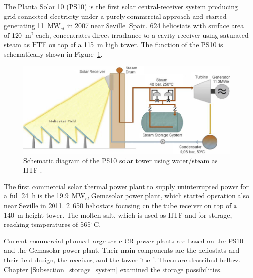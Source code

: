 The Planta Solar 10 (PS10) is the first solar central-receiver system producing grid-connected electricity under a purely commercial approach and started generating 11~MW$_{el}$ in 2007 near Seville, Spain. 624 heliostats with surface area of 120~m$^2$ each, concentrates direct irradiance to a cavity receiver using saturated steam as HTF on top of a 115~m high tower. The function of the PS10 is schematically shown in Figure~\ref{directsteamgeneration}.
\begin{figure}[!h] 
\centering
\includegraphics[width=0.7\linewidth]{FIG/directsteamgeneration}
\caption[Schematic diagram of the PS10 solar tower using water/steam as HTF.]{Schematic diagram of the PS10 solar tower using water/steam as HTF \cite{Medrano2010}.}\label{directsteamgeneration}
\end{figure}


The first commercial solar thermal power plant to supply uninterrupted power for a full 24~h is the 19.9~MW$_{el}$ Gemasolar power plant, which started operation also near Seville in 2011. 2~650 heliostats focusing on the tube receiver on top of a 140~m height tower. The molten salt, which is used as HTF and for storage, reaching temperatures of 565$\,^{\circ}\mathrm{C}$.

Current commercial planned large-scale CR power plants are based on the PS10 and the Gemasolar power plant. Their main components are the heliostats and their field design, the receiver, and the tower itself. These are described bellow. Chapter \ref{Subsection_storage_system} examined the storage possibilities.  \pagebreak
